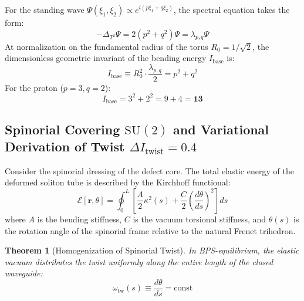 \documentclass[12pt,a4paper]{article}
\newtheorem{theorem}{Theorem}
\begin{document}
	For the standing wave $\Psi(\xi_1, \xi_2) \propto e^{i(p\xi_1 + q\xi_2)}$, the spectral equation takes the form:
	\begin{equation}
		-\Delta_{T^2} \Psi = 2 \left( p^2 + q^2 \right) \Psi = \lambda_{p,q} \Psi
	\end{equation}
	At normalization on the fundamental radius of the torus $R_0 = 1/\sqrt{2}$, the dimensionless geometric invariant of the bending energy $I_{\text{base}}$ is:
	\begin{equation}
		I_{\text{base}} \equiv R_0^2 \cdot \frac{\lambda_{p,q}}{2} = p^2 + q^2
	\end{equation}
	For the proton ($p=3, q=2$):
	\begin{equation}
		I_{\text{base}} = 3^2 + 2^2 = 9 + 4 = \mathbf{13}
	\end{equation}
	
	\subsection{Spinorial Covering $\mathrm{SU}(2)$ and Variational Derivation of Twist $\Delta I_{\text{twist}} = 0.4$}
	Consider the spinorial dressing of the defect core. The total elastic energy of the deformed soliton tube is described by the Kirchhoff functional:
	\begin{equation}
		\mathcal{E}[\mathbf{r}, \theta] = \oint_0^L \left[ \frac{A}{2} \kappa^2(s) + \frac{C}{2} \left( \frac{d\theta}{ds} \right)^2 \right] ds
	\end{equation}
	where $A$ is the bending stiffness, $C$ is the vacuum torsional stiffness, and $\theta(s)$ is the rotation angle of the spinorial frame relative to the natural Frenet trihedron.
	
	\begin{theorem}[Homogenization of Spinorial Twist]
		In BPS-equilibrium, the elastic vacuum distributes the twist uniformly along the entire length of the closed waveguide:
		\begin{equation}
			\omega_{\mathrm{tw}}(s) \equiv \frac{d\theta}{ds} = \mathrm{const}
		\end{equation}
	\end{theorem}
	
\end{document}
